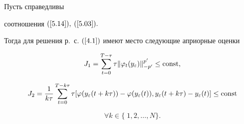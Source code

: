 \begin{lemm}


Пусть справедливы


соотношения $(\ref{5.14}),$ $(\ref{5.03}).$


Тогда для решения р.~с. $(\ref{4.1})$ имеют место следующие априорные оценки


\begin{equation}


J_1=


\sum^{T-\tau }_{t=0}\tau \| \varphi_t(y_\varepsilon)


\|^{p'}_{-p'} \le \const, \label{5.020}


\end{equation}


\begin{equation}


J_2 = \frac{1}{k\tau} \sum^{T-k\tau}_{t=0}\tau


[ \varphi(y_\varepsilon(t+k\tau))


-\varphi(y_\varepsilon(t)), y_\varepsilon(t+k\tau)-y_\varepsilon(t) ]


\le \const \label{5.021}


\end{equation}


$$


\forall k \in \{\;1,2,\dotsc,N\}.


$$


\end{lemm}


